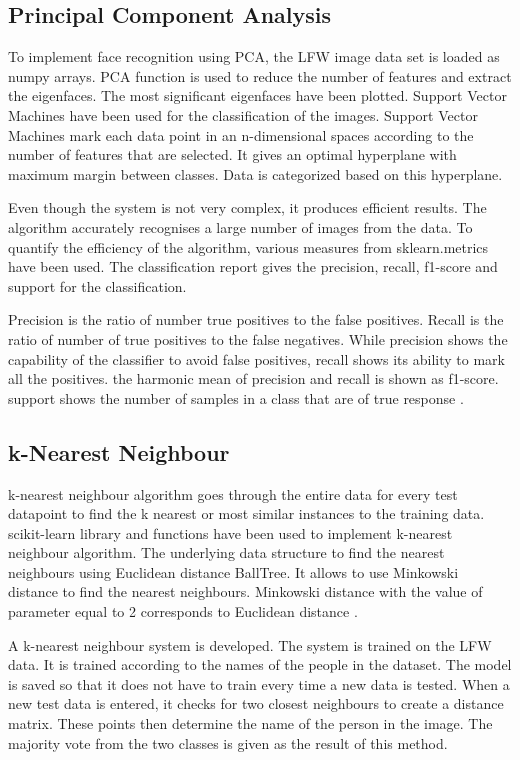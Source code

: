 \documentclass[conference]{IEEEtran}
\begin{document}
\begin{enumerate}
\subsection{Principal Component Analysis} 
\label{subsec: 4b. Principal Component Analysis}
To implement face recognition using PCA, the LFW image data set is loaded as numpy arrays. PCA function is used to reduce the number of features and extract the eigenfaces. The most significant eigenfaces have been plotted. Support Vector Machines have been used for the classification of the images. Support Vector Machines mark each data point in an n-dimensional spaces according to the number of features that are selected. It gives an optimal hyperplane with maximum margin between classes. Data is categorized based on this hyperplane.


Even though the system is not very complex, it produces efficient results. The algorithm accurately recognises a large number of images from the data. To quantify the efficiency of the algorithm, various measures from sklearn.metrics have been used. The classification report gives the precision, recall, f1-score and support for the classification. 

Precision is the ratio of number true positives to the false positives. Recall is the ratio of number of true positives to the false negatives. While precision shows the capability of the classifier to avoid false positives, recall shows its ability to mark all the positives. the harmonic mean of precision and recall is shown as f1-score. support shows the number of samples in a class that are of true response \cite{scikit-learn}.

\subsection{k-Nearest Neighbour} 
\label{subsec: 4c k-Nearest Neighbour}
k-nearest neighbour algorithm goes through the entire data for every test datapoint to find the k nearest or most similar instances to the training data. scikit-learn library and functions have been used to implement k-nearest neighbour algorithm. The underlying data structure to find the nearest neighbours using Euclidean distance BallTree. It allows to use Minkowski distance to find the nearest neighbours. Minkowski distance with the value of parameter equal to 2 corresponds to Euclidean distance \cite{weinberger2006distance}.

A k-nearest neighbour system is developed. The system is trained on the LFW data. It is trained according to the names of the people in the dataset. The model is saved so that it does not have to train every time a new data is tested. When a new test data is entered, it checks for two closest neighbours to create a distance matrix. These points then determine the name of the person in the image. The majority vote from the two classes is given as the result of this method.
	

\end{enumerate}
\end{document}
